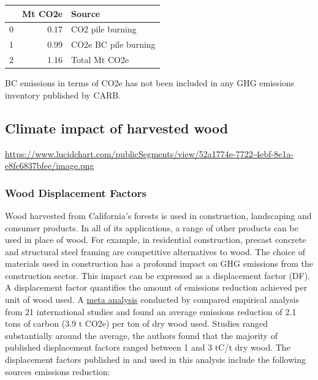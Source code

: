 \documentclass[a4paper]{article}
\begin{document}
\begin{center}
\begin{tabular}{rrl}
 & Mt CO2e & Source\\
\hline
0 & 0.17 & CO2 pile burning\\
1 & 0.99 & CO2e BC pile burning\\
2 & 1.16 & Total Mt CO2e\\
\end{tabular}

\end{center}

BC emissions in terms of CO2e has not been included in any GHG emissions
inventory published by CARB.

\subsection{Climate impact of harvested wood}
\label{sec:orgheadline11}

\url{https://www.lucidchart.com/publicSegments/view/52a1774e-7722-4ebf-8e1a-e8fc6837bfee/image.png}




\subsubsection{Wood Displacement Factors}
\label{sec:orgheadline5}

Wood harvested from California's forests is used in construction,
landscaping and consumer products. In all of its applications, a range
of other products can be used in place of wood. For example, in
residential construction, precast concrete and structural steel framing
are competitive alternatives to wood. The choice of materials used in
construction has a profound impact on GHG emissions from the
construction sector. This impact can be expressed as a displacement
factor (DF). A displacement factor quantifies the amount of emissions
reduction achieved per unit of wood used. A
\href{https://docs.google.com/uc?id=0B9-9Vlx0SkkFNjVGU0NrTm9HZ3M&export=download}{meta
analysis} conducted by \citep{Sathre2010} compared empirical analysis from 21 international studies and found an
average emissions reduction of 2.1 tons of carbon (3.9 t CO2e) per ton
of dry wood used. Studies ranged substantially around the average, the
authors found that the majority of published displacement factors ranged
between 1 and 3 tC/t dry wood. The displacement factors published in
\citep{Sathre2010} and used in this analysis include the
following sources emissions reduction:
\end{document}
